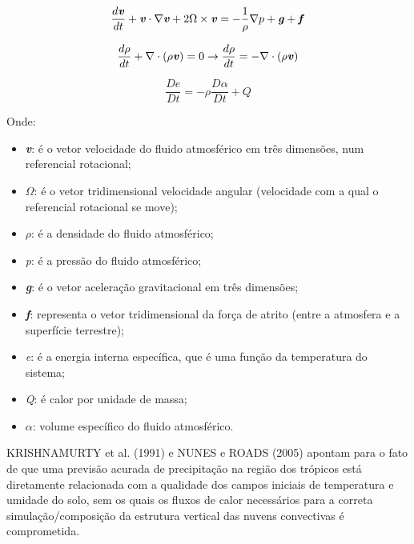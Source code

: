 \begin{equation}
\frac{d\textbf{\textit{v}}}{dt}+\textbf{\textit{v}}\cdot\nabla\textbf{\textit{v}}+2\Omega\times\textbf{\textit{v}}=-\frac{1}{\rho}\nabla{p}+\textbf{\textit{g}}+\textbf{\textit{f}}
\label{form01}
\end{equation}

\begin{equation}
\frac{d\rho}{dt}+\nabla\cdot(\rho\textbf{\textit{v}})=0\rightarrow\frac{d\rho}{dt}=-\nabla\cdot(\rho\textbf{\textit{v}})
\label{form02}
\end{equation}

\begin{equation}
\frac{D\textit{e}}{D\textit{t}}=-\rho\frac{D\alpha}{D\textit{t}}+\textit{Q}
\label{form03}
\end{equation}

Onde:

\begin{itemize}
\item \textbf{\textit{v}}: é o vetor velocidade do fluido atmosférico em três dimensões, num referencial rotacional;
\item $\Omega$: é o vetor tridimensional velocidade angular (velocidade com a qual o referencial rotacional se move);
\item $\rho$: é a densidade do fluido atmosférico;
\item \textit{p}: é a pressão do fluido atmosférico;
\item \textbf{\textit{g}}: é o vetor aceleração gravitacional em três dimensões;
\item \textbf{\textit{f}}: representa o vetor tridimensional da força de atrito (entre a atmosfera e a superfície terrestre);
\item \textit{e}: é a energia interna específica, que é uma função da temperatura do sistema;
\item \textit{Q}: é calor por unidade de massa;
\item $\alpha$: volume específico do fluido atmosférico. 
\end{itemize}

KRISHNAMURTY et al. (1991) e NUNES e ROADS (2005) apontam para o fato de que uma previsão acurada de precipitação na região dos trópicos está diretamente relacionada com a qualidade dos campos iniciais de temperatura e umidade do solo, sem os quais os fluxos de calor necessários para a correta simulação/composição da estrutura vertical das nuvens convectivas é comprometida.

